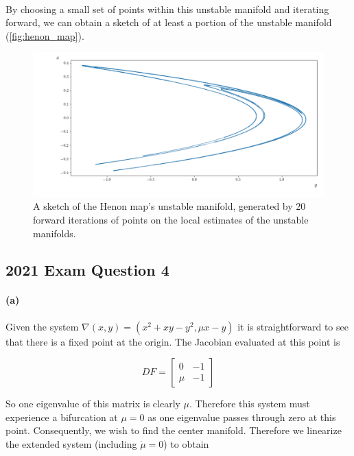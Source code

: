 \documentclass{article}
\begin{document}
\paragraph{}
By choosing a small set of points within this unstable manifold and iterating forward, we can 
obtain a sketch of at least a portion of the unstable manifold (\autoref{fig:henon_map}).

\begin{figure}[H]
    \centering
	\hspace{-0.5in}
    \includegraphics[scale = 0.5]{Henon_Map_Unstable_Manifold.png}
	\caption{A sketch of the Henon map's unstable manifold, generated by 20 forward iterations of 
	points on the local estimates of the unstable manifolds.}
    \label{fig:henon_map}
\end{figure}

\subsection*{2021 Exam Question 4}
\paragraph{(a)}
Given the system $\nabla(x,y) = (x^2+xy -y^2,\mu x - y)$ it is straightforward to see that there 
is a fixed point at the origin. The Jacobian evaluated at this point is 

\begin{equation*}
	DF = 
	\begin{bmatrix}
		0 & -1 \\
		\mu & -1
	\end{bmatrix}
\end{equation*}

So one eigenvalue of this matrix is clearly $\mu$. Therefore this system must experience a 
bifurcation at $\mu =0$ as one eigenvalue passes through zero at this point. Consequently, we wish to find the center manifold. Therefore 
we linearize the extended system (including $\dot \mu = 0$) to obtain 
\end{document}
